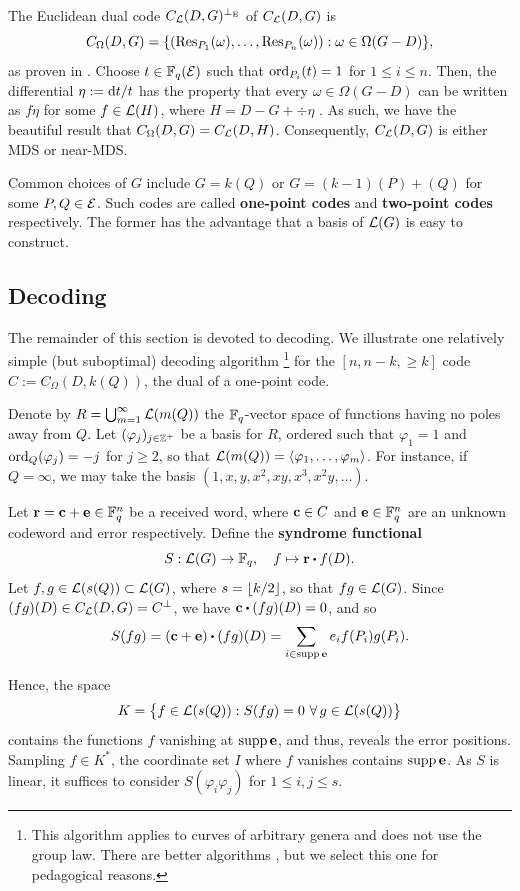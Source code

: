 \documentclass[twocolumn, 11pt]{scrartcl}
\begin{document}
The Euclidean dual code $C_\mathcal{L}(D,G)^{\perp_\mathrm{E}}$ of $C_\mathcal{L}(D,G)$ is
\[ C_\Omega(D,G)=\set*{(\Res_{P_1}(\omega),\hdots,\Res_{P_n}(\omega)):\omega\in\Omega(G-D)}, \]
as proven in \cite[Prop.~8]{o2008key}. Choose $t\in\mathbb{F}_q(\mathcal{E})$ such that $\operatorname{ord}_{P_i}(t)=1$ for $1\leq i\leq n$. Then, the differential $\eta:=\mathrm{d} t/t$ has the property that every $\omega\in\Omega(G-D)$ can be written as $f\eta$ for some $f\in\mathcal{L}(H)$, where $H=D-G+\div\eta$ \cite[\S8.1]{stichtenoth2009algebraic}. As such, we have the beautiful result that $C_\Omega(D,G)=C_\mathcal{L}(D,H)$. Consequently, $C_\mathcal{L}(D,G)$ is either MDS or near-MDS.

Common choices of $G$ include $G=k(Q)$ or $G=(k-1)(P)+(Q)$ for some $P,Q\in\mathcal{E}$. Such codes are called \textbf{one-point codes} and \textbf{two-point codes} respectively. The former has the advantage that a basis of $\mathcal{L}(G)$ is easy to construct.

\subsection{Decoding}

The remainder of this section is devoted to decoding. We illustrate one relatively simple (but suboptimal) decoding algorithm \cite[\S6.2]{hoholdt1998algebraic}\footnote{This algorithm applies to curves of arbitrary genera and does not use the group law. There are better algorithms \cite{hoholdt1995decoding,o2008key}, but we select this one for pedagogical reasons.} for the $[n,n-k,\geq\!k]$ code $C:=C_\Omega(D,k(Q))$, the dual of a one-point code.

Denote by $R=\bigcup_{m=1}^\infty \mathcal{L}(m(Q))$ the $\mathbb{F}_q$-vector space of functions having no poles away from $Q$. Let $(\varphi_j)_{j\in\mathbb{Z}^+}$ be a basis for $R$, ordered such that $\varphi_1=1$ and $\operatorname{ord}_Q(\varphi_j)=-j$ for $j\geq2$, so that $\mathcal{L}(m(Q))=\langle\varphi_1,\hdots,\varphi_m\rangle$. For instance, if $Q=\infty$, we may take the basis $(1,x,y,x^2,xy,x^3,x^2y,\hdots)$.

Let $\mathbf{r}=\mathbf{c}+\mathbf{e}\in\mathbb{F}_q^n$ be a received word, where $\mathbf{c}\in C$ and $\mathbf{e}\in\mathbb{F}_q^n$ are an unknown codeword and error respectively. Define the \textbf{syndrome functional}
\[ S:\mcL(G)\to\bbF_q, \quad f\mapsto\bfr\dotpr f(D). \]
Let $f,g\in\mathcal{L}(s(Q))\subset\mathcal{L}(G)$, where $s=\lfloor k/2\rfloor$, so that $fg\in\mathcal{L}(G)$. Since $(fg)(D)\in C_\mathcal{L}(D,G)=C^\perp$, we have $\bfc\dotpr (fg)(D)=0$, and so
\[ S(fg)=(\bfc+\bfe)\dotpr (fg)(D)=\sum_{i\in\supp\bfe} e_if(P_i)g(P_i). \]

\vspace{-1.9em}
Hence, the space
\[ K=\set[\big]{f\in\mcL(s(Q)):S(fg)=0\ \forall g\in \mcL(s(Q))} \]
contains the functions $f$ vanishing at $\operatorname{supp}\mathbf{e}$, and thus, reveals the error positions. Sampling $f\in K^*$, the coordinate set $I$ where $f$ vanishes contains $\operatorname{supp}\mathbf{e}$. As $S$ is linear, it suffices to consider $S(\varphi_i\varphi_j)$ for $1\leq i,j\leq s$.
\end{document}
